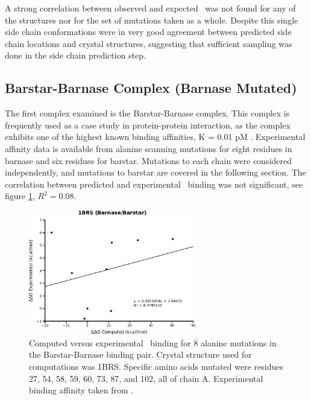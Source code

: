 A strong correlation between observed and expected \ddg\ was not found for any of the structures nor for the set of mutations taken as a whole.
Despite this single side chain conformations were in very good agreement between predicted side chain locations and crystal structures, suggesting that sufficient sampling was done in the side chain prediction step.



\FloatBarrier
\subsection{Barstar-Barnase Complex (Barnase Mutated)}
The first complex examined is the Barstar-Barnase complex.
This complex is frequently used as a case study in protein-protein interaction, as the complex exhibits one of the highest known binding affinities, K = 0.01 pM \cite{hartley1988barnase,hartley1989barnase,schreiber1993interaction}.
Experimental affinity data is available from alanine scanning mutations for eight residues in barnase and six residues for barstar.
Mutations to each chain were considered independently, and mutations to barstar are covered in the following section.
The correlation between predicted and experimental \ddg\ binding was not significant, see figure \ref{figure:computational_mutation_scanning/1BRSa_ddg}, $R^{2}=0.08$.


\begin{figure}[h]
    \centering
    \includegraphics[width=0.65\textwidth]{figures/1brs_barnase_barstar.png}
    \caption{Computed versus experimental \ddg\ binding for 8 alanine mutations in the Barstar-Barnase binding pair.
    Crystal structure used for computations was 1BRS.
    Specific amino acids mutated were residues 27, 54, 58, 59, 60, 73, 87, and 102, all of chain A.
    Experimental binding affinity taken from \protect\cite{thorn2001asedb}.}
    \label{figure:computational_mutation_scanning/1BRSa_ddg}
\end{figure}

